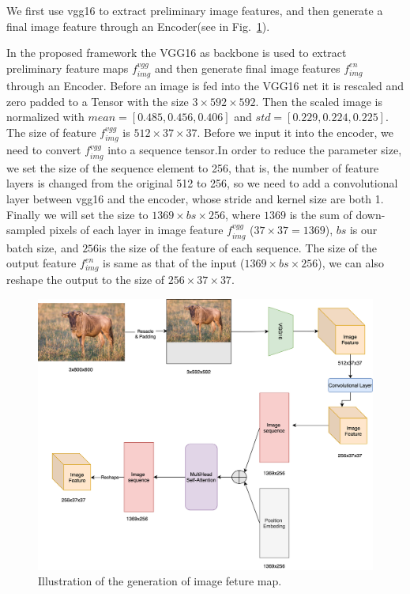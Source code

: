 We first use vgg16 to extract preliminary image features, and then generate a final image feature through an Encoder(see in Fig.~\ref{fig:imgfeatbaseline}).

In the proposed framework the VGG16 as backbone is used to extract preliminary feature maps $f^{vgg}_{img}$ and  then generate final image features $f^{en}_{img}$ through an Encoder. Before an image is fed into the VGG16 net it is rescaled and zero padded to a Tensor with the size $ 3\times592\times592 $. Then the scaled image is normalized with $ mean = [0.485, 0.456, 0.406 ]$ and $ std = [ 0.229, 0.224, 0.225]$.   The size of feature $f^{vgg}_{img}$ is $512 \times 37 \times 37$. Before we input it into the encoder, we need to convert $f^{vgg}_{img}$  into a sequence tensor.In order to reduce the parameter size, we set the size of the sequence element to 256, that is, the number of feature layers is changed from the original 512 to 256, so we need to add a convolutional layer between vgg16 and the encoder, whose stride and kernel size are both 1. Finally we will set the size to $ 1369 \times bs \times 256 $, where $ 1369 $ is the sum of down-sampled pixels of each layer in image feature $f^{vgg}_{img}$ ($ 37 \times 37 = 1369$), $ bs $ is our batch size, and $ 256  $is the size of the feature of each sequence. The size of the output feature $f^{en}_{img}$ is same as that of the input ($ 1369 \times bs \times 256 $), we can also reshape the output to the size of $256 \times 37 \times 37$.


\begin{figure}[tbph!]
	\centering
	\includegraphics[width=0.9\linewidth]{figures/img_feat_baseline}
	\caption[Generation of Image Feature Map]{Illustration of the generation of image feture map.}
	\label{fig:imgfeatbaseline}
\end{figure}


